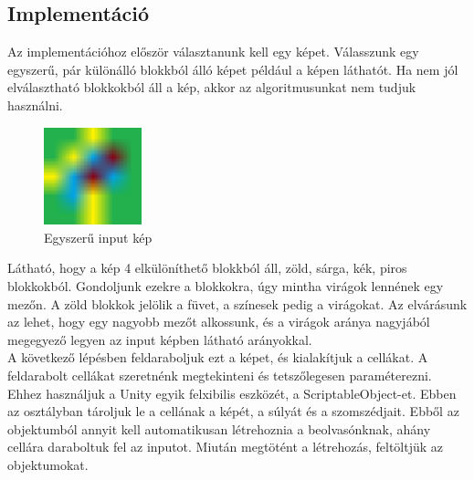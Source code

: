 \subsection{Implementáció}
Az implementációhoz először választanunk kell egy képet. Válasszunk egy egyszerű, pár különálló blokkból álló képet például a képen láthatót. Ha nem jól elválasztható blokkokból áll a kép, akkor az algoritmusunkat nem tudjuk használni.
 \begin{figure}[h]
     \centering
     \includegraphics[width=80pt]{images/block-easy.png}
     \caption{Egyszerű input kép}
     \label{fig:egyszeru-kep}
 \end{figure}
Látható, hogy a kép 4 elkülöníthető blokkból áll, zöld, sárga, kék, piros blokkokból. Gondoljunk ezekre a blokkokra, úgy mintha virágok lennének egy mezőn. A zöld blokkok jelölik a füvet, a színesek pedig a virágokat. Az elvárásunk az lehet, hogy egy nagyobb mezőt alkossunk, és a virágok aránya nagyjából megegyező legyen az input képben látható arányokkal.\\
A következő lépésben feldaraboljuk ezt a képet, és kialakítjuk a cellákat. A feldarabolt cellákat szeretnénk megtekinteni és tetszőlegesen paraméterezni. Ehhez használjuk a Unity egyik felxibilis eszközét, a ScriptableObject-et.
Ebben az osztályban tároljuk le a cellának a képét, a súlyát és a szomszédjait. Ebből az objektumból annyit kell automatikusan létrehoznia a beolvasónknak, ahány cellára daraboltuk fel az inputot. Miután megtötént a létrehozás, feltöltjük az objektumokat.

